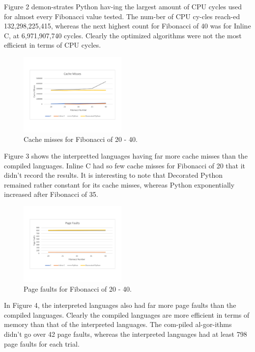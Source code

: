 \documentclass{sig-alternate}
\begin{document}
Figure 2 demon-strates Python hav-ing the largest 
amount of CPU cycles used for almost every Fibonacci value tested. The 
num-ber of CPU cy-cles reach-ed 132,298,225,415,
 whereas the next highest count for Fibonacci of 40 
was for Inline C, at 6,971,907,740 cycles. Clearly the optimized
 algorithms were not the most efficient in terms of CPU cycles.

\begin{figure}[ht]
	\centering
		\includegraphics[width=0.47\textwidth] {CacheMisses.pdf}
	\caption{Cache misses for Fibonacci of 20 - 40.}
	\label{Cache misses}
\end{figure}

Figure 3 shows the interpretted languages having far more cache misses than the compiled languages. Inline C had so few cache misses for Fibonacci of 20 that it didn't record the results. It is interesting to note that Decorated Python remained rather constant for its cache misses, whereas Python exponentially increased after Fibonacci of 35.

\begin{figure}[ht]
	\centering
		\includegraphics[width=0.47\textwidth] {PageFaults.pdf}
	\caption{Page faults for Fibonacci of 20 - 40.}
	\label{Page Faults}
\end{figure}

In Figure 4, the interpreted languages also had far more page faults than the compiled languages. Clearly the 
compiled languages are more efficient in terms of memory than that of the interpreted languages. The com-piled al-gor-ithms didn't go over 42 page faults, whereas the interpreted languages had at least 798 page faults for each trial.
\end{document}
